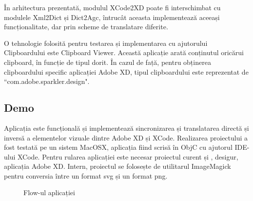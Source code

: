 În arhitectura prezentată, modulul XCode2XD poate fi interschimbat cu modulele Xml2Dict și Dict2Agc, întrucât aceasta implementează aceeași funcționalitate, dar prin scheme de translatare diferite.


O tehnologie folosită pentru testarea și implementarea cu ajutorului Clipboardului este Clipboard Viewer. Această aplicație arată conținutul oricărui clipboard, în funcție de tipul dorit. În cazul de față, pentru obținerea clipboardului specific aplicației Adobe XD, tipul clipboardului este reprezentat de ``com.adobe.sparkler.design".

\subsection{Demo}
Aplicația este funcțională și implementează sincronizarea și translatarea directă și inversă a elementelor vizuale dintre Adobe XD și XCode. 
Realizarea proiectului a fost testată pe un sistem MacOSX, aplicația fiind scrisă în ObjC cu ajutorul IDE-ului XCode. Pentru rularea aplicației este necesar proiectul curent  și , desigur, aplicația Adobe XD.
Intern, proiectul se folosește de utilitarul ImageMagick pentru conversia între un format svg și un format png.

\begin{figure}[!htbp]
\centering
{}
\caption{Flow-ul aplicației} \label{fig:Prezentare}
\end{figure}

